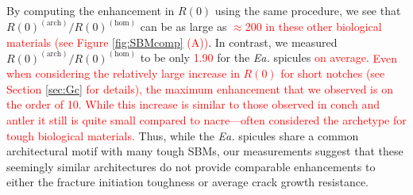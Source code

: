 \documentclass[12pt,onecolumn]{article}
\makeatletter
\newcommand{\EA}{\textit{Ea.\@}\xspace}
\makeatother
\begin{document}
\begin{bibunit}
By computing the enhancement in $R(0)$ using the same procedure, we see that $R(0)^{(\mathrm{arch})}/R(0)^{(\mathrm{hom})}$ can be as large as \textcolor{red}{$\approx$200 in these other biological materials (see Figure \ref{fig:SBMcomp} (A))}. In contrast, we measured $R(0)^{(\mathrm{arch})}/R(0)^{(\mathrm{hom})}$ to be only \textcolor{red}{1.90} for the \EA spicules \textcolor{red}{on average}. \textcolor{red}{Even when considering the relatively large increase in $R(0)$ for short notches (see Section \ref{sec:Gc} for details), the maximum enhancement that we observed is on the order of 10. While this increase is similar to those observed in conch and antler it still is quite small compared to nacre---often considered the archetype for tough biological materials.} Thus, while the \EA spicules share a common architectural motif with many tough SBMs, our measurements suggest that these seemingly similar architectures do not provide comparable enhancements to either the fracture initiation toughness or average crack growth resistance.


\end{bibunit}
\end{document}
